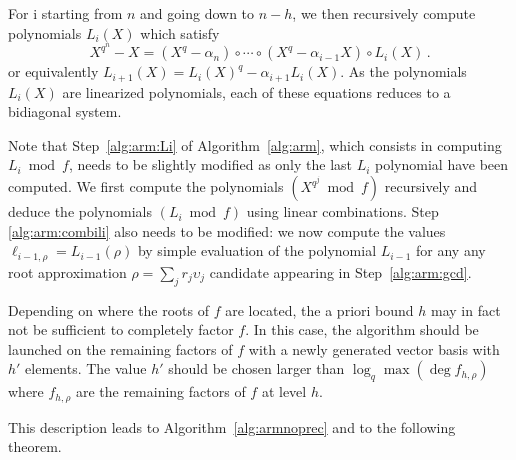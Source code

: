 \documentclass{article}
\newcommand{\dd}{d}
\newcommand{\qq}{q}
\newcommand{\nn}{n}
\newcommand{\bigO}{O}
\newcommand{\Mul}{\mathsf{M}}
\newcounter{algo}
\begin{document}
For i starting from $\nn$ and going down to $n-h$, we then recursively compute polynomials $L_i(X)$ which satisfy
$$X^{\qq^\nn}-X= (X^{\qq}-\alpha_n) \circ \cdots \circ (X^{\qq}-\alpha_{i-1} X) \circ L_{i}(X)\,.  $$
or equivalently $L_{i+1}(X)=L_i(X)^q-\alpha_{i+1}L_i(X)$. 
%
As the polynomials $L_i(X)$ are linearized polynomials, each of these equations reduces to
a bidiagonal system. %

Note that Step~\ref{alg:arm:Li} of Algorithm~\ref{alg:arm}, which consists in computing $L_i \bmod f$, needs to be slightly modified as only the last $L_i$ polynomial have been computed. %
We first compute the polynomials $(X^{q^j}\bmod f)$ recursively and deduce the polynomials $(L_i\bmod f)$ using linear combinations.
%
Step \ref{alg:arm:combili}  also needs to be modified: we now compute the values $\ell_{i-1, \rho}= L_{i-1}(\rho)$ by simple evaluation of the polynomial $L_{i-1}$ for any any root approximation $\rho=\sum_j r_j \upsilon_j$ candidate appearing in Step~\ref{alg:arm:gcd}. %
 
 Depending on where the roots of $f$ are located, the a priori bound $h$ may in fact not be sufficient to completely factor $f$. In this case, the algorithm should be launched on the remaining factors of $f$ with a newly generated vector basis with $h'$ elements. The value $h'$ should be chosen larger than $\log_{\qq} \max(\deg f_{h,\rho})$ where $f_{h,\rho}$ are the remaining factors of $f$ at level $h$.

This description leads to Algorithm~\ref{alg:armnoprec} and to the following theorem.
\end{document}
